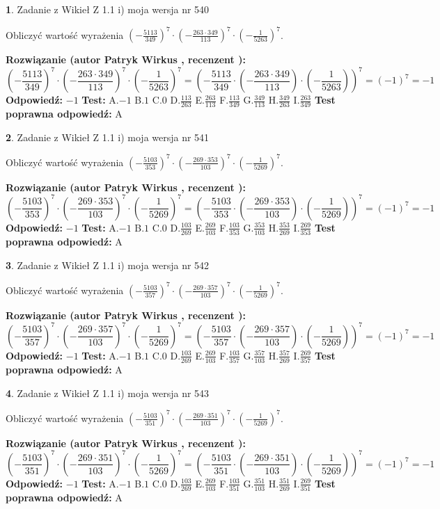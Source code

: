 \documentclass[12pt, a4paper]{article}
\theoremstyle{definition} %
\newtheorem{zad}{}
\newcommand{\zadStart}[1]{\begin{zad}#1\newline}
\newcommand{\zadStop}{\end{zad}}
\newcommand{\rozwStart}[2]{\noindent \textbf{Rozwiązanie (autor #1 , recenzent #2): }\newline}
\newcommand{\rozwStop}{\newline}
\newcommand{\odpStart}{\noindent \textbf{Odpowiedź:}\newline}
\newcommand{\odpStop}{\newline}
\newcommand{\testStart}{\noindent \textbf{Test:}\newline}
\newcommand{\testStop}{\newline}
\newcommand{\kluczStart}{\noindent \textbf{Test poprawna odpowiedź:}\newline}
\newcommand{\kluczStop}{\newline}
\begin{document}
\zadStart{Zadanie z Wikieł Z 1.1 i) moja wersja nr 540}

Obliczyć wartość wyrażenia $(-\frac{5113}{349})^{7} \cdot (-\frac{263 \cdot 349}{113})^{7} \cdot (-\frac{1}{5263})^{7}$.
\zadStop
\rozwStart{Patryk Wirkus}{}
$$(-\frac{5113}{349})^{7} \cdot (-\frac{263 \cdot 349}{113})^{7} \cdot (-\frac{1}{5263})^{7} = (-\frac{5113}{349} \cdot (-\frac{263 \cdot 349}{113}) \cdot (-\frac{1}{5263}))^{7} = (-1)^{7} = -1$$
\rozwStop
\odpStart
$-1$
\odpStop
\testStart
A.$-1$ B.$1$ C.$0$ D.$\frac{113}{263}$ E.$\frac{263}{113}$
F.$\frac{113}{349}$ G.$\frac{349}{113}$
H.$\frac{349}{263}$
I.$\frac{263}{349}$
\testStop
\kluczStart
A
\kluczStop



\zadStart{Zadanie z Wikieł Z 1.1 i) moja wersja nr 541}

Obliczyć wartość wyrażenia $(-\frac{5103}{353})^{7} \cdot (-\frac{269 \cdot 353}{103})^{7} \cdot (-\frac{1}{5269})^{7}$.
\zadStop
\rozwStart{Patryk Wirkus}{}
$$(-\frac{5103}{353})^{7} \cdot (-\frac{269 \cdot 353}{103})^{7} \cdot (-\frac{1}{5269})^{7} = (-\frac{5103}{353} \cdot (-\frac{269 \cdot 353}{103}) \cdot (-\frac{1}{5269}))^{7} = (-1)^{7} = -1$$
\rozwStop
\odpStart
$-1$
\odpStop
\testStart
A.$-1$ B.$1$ C.$0$ D.$\frac{103}{269}$ E.$\frac{269}{103}$
F.$\frac{103}{353}$ G.$\frac{353}{103}$
H.$\frac{353}{269}$
I.$\frac{269}{353}$
\testStop
\kluczStart
A
\kluczStop



\zadStart{Zadanie z Wikieł Z 1.1 i) moja wersja nr 542}

Obliczyć wartość wyrażenia $(-\frac{5103}{357})^{7} \cdot (-\frac{269 \cdot 357}{103})^{7} \cdot (-\frac{1}{5269})^{7}$.
\zadStop
\rozwStart{Patryk Wirkus}{}
$$(-\frac{5103}{357})^{7} \cdot (-\frac{269 \cdot 357}{103})^{7} \cdot (-\frac{1}{5269})^{7} = (-\frac{5103}{357} \cdot (-\frac{269 \cdot 357}{103}) \cdot (-\frac{1}{5269}))^{7} = (-1)^{7} = -1$$
\rozwStop
\odpStart
$-1$
\odpStop
\testStart
A.$-1$ B.$1$ C.$0$ D.$\frac{103}{269}$ E.$\frac{269}{103}$
F.$\frac{103}{357}$ G.$\frac{357}{103}$
H.$\frac{357}{269}$
I.$\frac{269}{357}$
\testStop
\kluczStart
A
\kluczStop



\zadStart{Zadanie z Wikieł Z 1.1 i) moja wersja nr 543}

Obliczyć wartość wyrażenia $(-\frac{5103}{351})^{7} \cdot (-\frac{269 \cdot 351}{103})^{7} \cdot (-\frac{1}{5269})^{7}$.
\zadStop
\rozwStart{Patryk Wirkus}{}
$$(-\frac{5103}{351})^{7} \cdot (-\frac{269 \cdot 351}{103})^{7} \cdot (-\frac{1}{5269})^{7} = (-\frac{5103}{351} \cdot (-\frac{269 \cdot 351}{103}) \cdot (-\frac{1}{5269}))^{7} = (-1)^{7} = -1$$
\rozwStop
\odpStart
$-1$
\odpStop
\testStart
A.$-1$ B.$1$ C.$0$ D.$\frac{103}{269}$ E.$\frac{269}{103}$
F.$\frac{103}{351}$ G.$\frac{351}{103}$
H.$\frac{351}{269}$
I.$\frac{269}{351}$
\testStop
\kluczStart
A
\kluczStop
\end{document}
